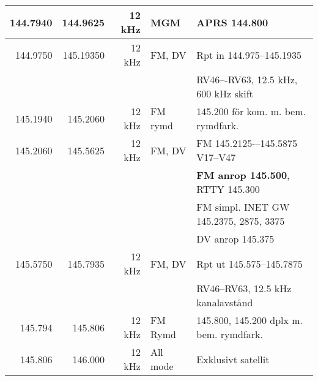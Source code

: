 \begin{landscape}
\begin{tabular}{rrrll}
	         144.7940         & 144.9625      & 12 kHz        & MGM                 & APRS 144.800                                                 \\ \hline
	         144.9750         & 145.19350     & 12 kHz        & FM, DV              & Rpt in 144.975--145.1935                                     \\
                                  &               &               &                     & RV46–-RV63, 12.5 kHz, 600 kHz skift                          \\ \hline
	         145.1940         & 145.2060      & 12 kHz        & FM rymd             & 145.200 för kom. m. bem. rymdfark.                           \\ \hline
	         145.2060         & 145.5625      & 12 kHz        & FM, DV              & FM 145.2125-–145.5875  V17–V47                               \\
                                  &               &               &                     & \textbf{FM anrop 145.500}, RTTY 145.300                      \\
                                  &               &               &                     & FM simpl. INET GW 145.2375, 2875, 3375                       \\
                                  &               &               &                     & DV anrop 145.375                                             \\ \hline
	         145.5750         & 145.7935      & 12 kHz        & FM, DV              & Rpt ut 145.575--145.7875                                     \\
                                  &               &               &                     & RV46–RV63, 12.5 kHz kanalavstånd                             \\ \hline
	          145.794         & 145.806       & 12 kHz        & FM Rymd             & 145.800, 145.200 dplx m. bem. rymdfark.                      \\ \hline
	          145.806         & 146.000       & 12 kHz        & All mode            & Exklusivt satellit                                           \\ \hline
\end{tabular}
\clearpage

\end{landscape}
